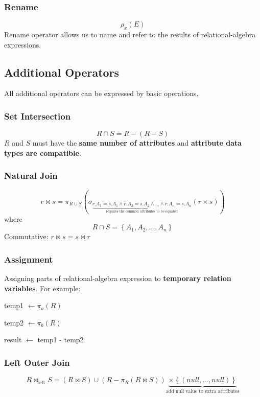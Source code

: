 \documentclass[11pt,a4paper]{article}
\begin{document}
\subsubsection{Rename}
\[
\rho_x(E)
\]
Rename operator allows us to name and refer to the results of relational-algebra expressions.

\subsection{Additional Operators}
All additional operators can be expressed by basic operations.

\subsubsection{Set Intersection}
\[
R \cap S = R - (R - S)
\]
$R$ and $S$ must have the \textbf{same number of attributes} and \textbf{attribute data types are compatible}.

\subsubsection{Natural Join}
\[
r \bowtie s = \pi_{R \cup S}(\sigma_{\underbrace{r.A_1 = s.A_1 \land r.A_2 = s.A_2 \land \dots \land r.A_n = s.A_n}_{\text{requires the common attributes to be equated}}}(r \times s))
\]
where
\[
R \cap S = \left\{A_1, A_2, \dots, A_n \right\}
\]
Commutative: $r \bowtie s = s \bowtie r$


\subsubsection{Assignment}
Assigning parts of relational-algebra expression to \textbf{temporary relation variables}. For example: \par
\quad temp1 $\leftarrow \pi_a(R)$ \par
\quad temp2 $\leftarrow \pi_b(R)$ \par
\quad result $\leftarrow$ temp1 - temp2

\subsubsection{Left Outer Join}
\[
R \bowtie_{\text{left}} S = (R \bowtie S) \cup (R - \pi_R(R \bowtie S)) \underbrace{\times \left\{(null, \dots, null) \right\}}_{\text{add null value to extra attributes}}
\]
\end{document}
